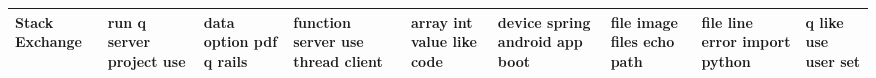\documentclass[11pt,a4paper]{article}
\begin{document}
\begin{appendices}
\begin{table}[htp]
\begin{tiny}
\begin{tabular}{|p{}|p{}|p{}|p{}|p{}|p{}|p{}|p{}|p{}|}
Stack Exchange & run \newline q \newline server \newline project \newline use & data \newline option \newline pdf \newline q \newline rails & function \newline server \newline use \newline thread \newline client & array \newline int \newline value \newline like \newline code & device \newline spring \newline android \newline app \newline boot & file \newline image \newline files \newline echo \newline path & file \newline line \newline error \newline import \newline python & q \newline like \newline use \newline user \newline set\\\hline

\end{tabular}
\end{tiny}
\end{table}
\end{appendices}
\end{document}
